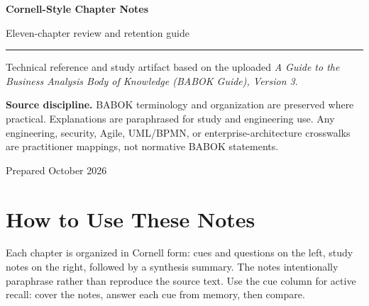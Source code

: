 \documentclass[11pt]{article}
\begin{document}
\hypersetup{pageanchor=false}%
\begin{titlepage}
\centering
\vspace*{1.15in}
{\Huge\bfseries\color{BANavy} Cornell-Style Chapter Notes\par}
\vspace{0.35in}
{\Large\color{BAOrange} Eleven-chapter review and retention guide\par}
\vspace{0.55in}
\rule{0.78\textwidth}{1.2pt}\par
\vspace{0.35in}
{\large Technical reference and study artifact based on the uploaded \emph{A Guide to the Business Analysis Body of Knowledge (BABOK Guide), Version 3}.\par}
\vfill
\begin{keybox}
\textbf{Source discipline.} BABOK terminology and organization are preserved where practical. Explanations are paraphrased for study and engineering use. Any engineering, security, Agile, UML/BPMN, or enterprise-architecture crosswalks are practitioner mappings, not normative BABOK statements.
\end{keybox}
\vspace{0.35in}
{\small Prepared October 2026\par}
\end{titlepage}\hypersetup{pageanchor=true}
\tableofcontents
\newpage
\section{How to Use These Notes}
Each chapter is organized in Cornell form: cues and questions on the left, study notes on the right, followed by a synthesis summary. The notes intentionally paraphrase rather than reproduce the source text. Use the cue column for active recall: cover the notes, answer each cue from memory, then compare.
\end{document}
